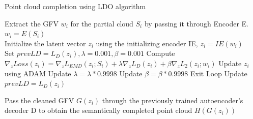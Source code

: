 \documentclass[10pt,twocolumn,letterpaper]{article}
\begin{document}
 
 \begin{algorithm}[H]
 \caption{Point cloud completion using LDO algorithm}\label{alg:ldo}
 \begin{algorithmic}[1]
 \renewcommand{\algorithmicrequire}{\textbf{Require:}}
 \renewcommand{\algorithmicrequire}{\textbf{Require:}}
 \STATE Extract the GFV $w_i$ for the partial cloud $S_i$ by passing it through Encoder E. $w_i = E(S_i)$\\
 \STATE Initialize the latent vector $z_i$ using the initializing encoder IE, $z_i = IE(w_i)$\\
 \STATE Set $ prevLD = L_D(z_i), \lambda=0.001, \beta = 0.001$
  \STATE Compute $\nabla_z Loss(z_i) = \nabla_z L_{EMD}(z_i;S_i)+ \lambda \nabla_z L_D(z_i) + \beta \nabla_z L_2(z_i;w_i)$%
  \STATE Update $z_i$ using ADAM
  \STATE Update $\lambda = \lambda*0.9998$
  \STATE Update $\beta = \beta*0.9998$
  \STATE Exit Loop
  \ENDIF
  \STATE Update $prevLD = L_D(z_i)$
  \ENDWHILE

  \STATE Pass the cleaned GFV $G(z_i)$ through the previously trained autoencoder's decoder D to obtain the semantically completed point cloud $H(G(z_i))$

 \end{algorithmic} 
 \end{algorithm}
\end{document}
